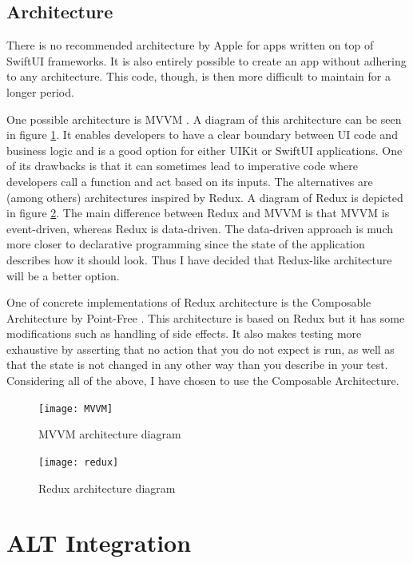 \subsection{Architecture}

There is no recommended architecture by Apple for apps written on top of SwiftUI frameworks. It is also entirely possible to create an app without adhering to any architecture. This code, though, is then more difficult to maintain for a longer period.

One possible architecture is MVVM \cite{mvvm}. A diagram of this architecture can be seen in figure \ref{mvvm}. It enables developers to have a clear boundary between UI code and business logic and is a good option for either UIKit or SwiftUI applications. One of its drawbacks is that it can sometimes lead to imperative code where developers call a function and act based on its inputs. The alternatives are (among others) architectures inspired by Redux. A diagram of Redux is depicted in figure \ref{redux}. The main difference between Redux and MVVM is that MVVM is event-driven, whereas Redux is data-driven. The data-driven approach is much more closer to declarative programming since the state of the application describes how it should look. Thus I have decided that Redux-like architecture will be a better option.

One of concrete implementations of Redux architecture is the Composable Architecture by Point-Free \cite{tca}. This architecture is based on Redux but it has some modifications such as handling of side effects. It also makes testing more exhaustive by asserting that no action that you do not expect is run, as well as that the state is not changed in any other way than you describe in your test. Considering all of the above, I have chosen to use the Composable Architecture. 

\begin{figure}
    \texttt{[image: MVVM]}
    \caption{MVVM architecture diagram \cite{mvvm}}\label{mvvm}
\end{figure}

\begin{figure}
    \texttt{[image: redux]}
    \caption{Redux architecture diagram \cite{react-redux}}\label{redux}
\end{figure}

\section{ALT Integration}

